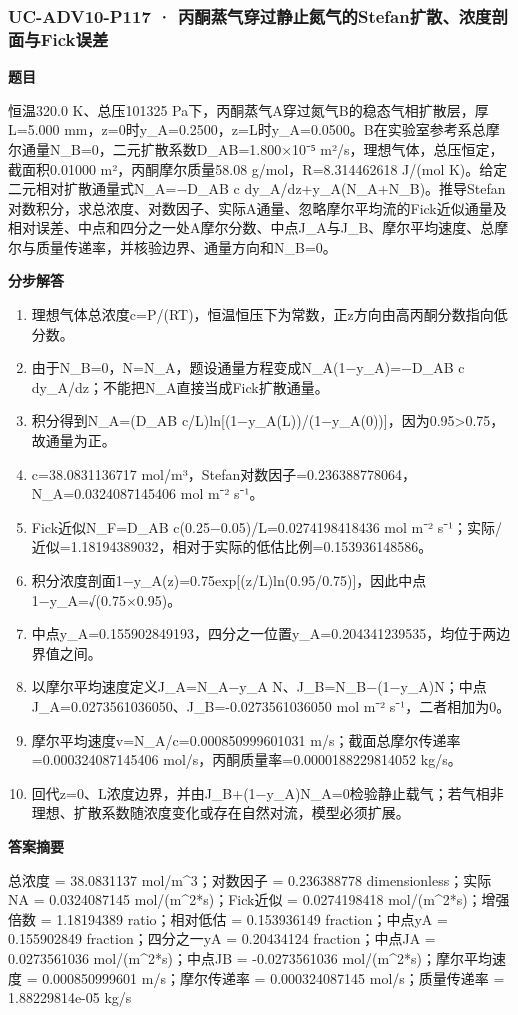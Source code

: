 \documentclass[UTF8,11pt,a4paper]{ctexart}
\begin{document}
\subsubsection*{UC-ADV10-P117 · 丙酮蒸气穿过静止氮气的Stefan扩散、浓度剖面与Fick误差}
\noindent\textbf{题目}\par
恒温320.0 K、总压101325 Pa下，丙酮蒸气A穿过氮气B的稳态气相扩散层，厚L=5.000 mm，z=0时y\_A=0.2500，z=L时y\_A=0.0500。B在实验室参考系总摩尔通量N\_B=0，二元扩散系数D\_AB=1.800×10⁻⁵ m²/s，理想气体，总压恒定，截面积0.01000 m²，丙酮摩尔质量58.08 g/mol，R=8.314462618 J/(mol K)。给定二元相对扩散通量式N\_A=−D\_AB c dy\_A/dz+y\_A(N\_A+N\_B)。推导Stefan对数积分，求总浓度、对数因子、实际A通量、忽略摩尔平均流的Fick近似通量及相对误差、中点和四分之一处A摩尔分数、中点J\_A与J\_B、摩尔平均速度、总摩尔与质量传递率，并核验边界、通量方向和N\_B=0。\par
\medskip\noindent\textbf{分步解答}
\begin{enumerate}
\item 理想气体总浓度c=P/(RT)，恒温恒压下为常数，正z方向由高丙酮分数指向低分数。
\item 由于N\_B=0，N=N\_A，题设通量方程变成N\_A(1−y\_A)=−D\_AB c dy\_A/dz；不能把N\_A直接当成Fick扩散通量。
\item 积分得到N\_A=(D\_AB c/L)ln[(1−y\_A(L))/(1−y\_A(0))]，因为0.95>0.75，故通量为正。
\item c=38.0831136717 mol/m³，Stefan对数因子=0.236388778064，N\_A=0.0324087145406 mol m⁻² s⁻¹。
\item Fick近似N\_F=D\_AB c(0.25−0.05)/L=0.0274198418436 mol m⁻² s⁻¹；实际/近似=1.18194389032，相对于实际的低估比例=0.153936148586。
\item 积分浓度剖面1−y\_A(z)=0.75exp[(z/L)ln(0.95/0.75)]，因此中点1−y\_A=√(0.75×0.95)。
\item 中点y\_A=0.155902849193，四分之一位置y\_A=0.204341239535，均位于两边界值之间。
\item 以摩尔平均速度定义J\_A=N\_A−y\_A N、J\_B=N\_B−(1−y\_A)N；中点J\_A=0.0273561036050、J\_B=-0.0273561036050 mol m⁻² s⁻¹，二者相加为0。
\item 摩尔平均速度v=N\_A/c=0.000850999601031 m/s；截面总摩尔传递率=0.000324087145406 mol/s，丙酮质量率=0.0000188229814052 kg/s。
\item 回代z=0、L浓度边界，并由J\_B+(1−y\_A)N\_A=0检验静止载气；若气相非理想、扩散系数随浓度变化或存在自然对流，模型必须扩展。
\end{enumerate}
\noindent\textbf{答案摘要}\par
总浓度 = 38.0831137 mol/m\textasciicircum{}3；对数因子 = 0.236388778 dimensionless；实际NA = 0.0324087145 mol/(m\textasciicircum{}2*s)；Fick近似 = 0.0274198418 mol/(m\textasciicircum{}2*s)；增强倍数 = 1.18194389 ratio；相对低估 = 0.153936149 fraction；中点yA = 0.155902849 fraction；四分之一yA = 0.20434124 fraction；中点JA = 0.0273561036 mol/(m\textasciicircum{}2*s)；中点JB = -0.0273561036 mol/(m\textasciicircum{}2*s)；摩尔平均速度 = 0.000850999601 m/s；摩尔传递率 = 0.000324087145 mol/s；质量传递率 = 1.88229814e-05 kg/s\par
\end{document}
